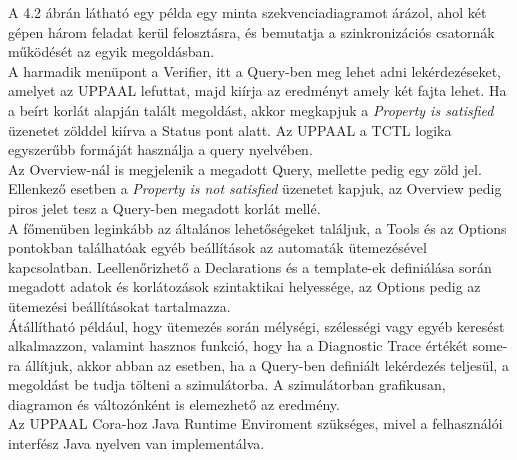 \documentclass [12pt]{report}
\begin{document}
A 4.2 ábrán látható egy példa egy minta szekvenciadiagramot árázol, ahol két gépen három feladat kerül felosztásra, és bemutatja a szinkronizációs csatornák működését az egyik megoldásban.\\
A harmadik menüpont a Verifier, itt a Query-ben meg lehet adni lekérdezéseket, amelyet az UPPAAL lefuttat, majd kiírja az eredményt amely két fajta lehet. Ha a beírt korlát alapján talált megoldást, akkor megkapjuk a \emph{Property is satisfied} üzenetet zölddel kiírva a Status pont alatt.  Az UPPAAL a TCTL logika egyszerűbb formáját használja a query nyelvében.\\
 Az Overview-nál is megjelenik a megadott Query, mellette pedig egy zöld jel. Ellenkező esetben a \emph{Property is not satisfied} üzenetet kapjuk, az Overview pedig piros jelet tesz a Query-ben megadott korlát mellé.    \\
A főmenüben leginkább az általános lehetőségeket találjuk, a Tools és az Options pontokban találhatóak egyéb beállítások az automaták ütemezésével kapcsolatban. Leellenőrizhető a Declarations és a template-ek definiálása során megadott adatok és korlátozások szintaktikai helyessége, az Options pedig az ütemezési beállításokat tartalmazza. \\
Átállítható például, hogy ütemezés során mélységi, szélességi vagy egyéb keresést alkalmazzon, valamint hasznos funkció, hogy ha a Diagnostic Trace értékét some-ra állítjuk, akkor abban az esetben, ha a Query-ben definiált lekérdezés teljesül, a megoldást be tudja tölteni a szimulátorba. A szimulátorban grafikusan, diagramon és változónként is elemezhető az eredmény. \\
Az UPPAAL Cora-hoz Java Runtime Enviroment szükséges, mivel a felhasználói interfész Java nyelven van implementálva.
\end{document}
